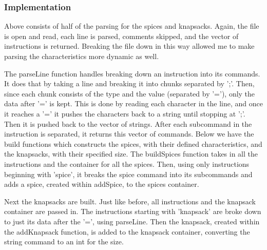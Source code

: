 \documentclass[12pt, letterpaper]{article}
\begin{document}
\subsubsection{Implementation}
\begin{center}
   
\end{center}
Above consists of half of the parsing for the spices and knapsacks.
Again, the file is open and read, each line is parsed, comments skipped, and the vector of instructions is returned.
Breaking the file down in this way allowed me to make parsing the characteristics more dynamic as well.
\begin{center}
   
\end{center}
The parseLine function handles breaking down an instruction into its commands.
It does that by taking a line and breaking it into chunks separated by ';'.
Then, since each chunk consists of the type and the value (separated by '='), only the data after '=' is kept.
This is done by reading each character in the line, and once it reaches a '=' it pushes the characters back to a string until stopping at ';'.
Then it is pushed back to the vector of strings.
After each subcommand in the instruction is separated, it returns this vector of commands.
\vspace*{5px}
\newline
Below we have the build functions which constructs the spices, with their defined characteristics, and the knapsacks, with their specified size.
The buildSpices function takes in all the instructions and the container for all the spices.
Then, using only instructions beginning with 'spice', it breaks the spice command into its subcommands and adds a spice, created within addSpice, to the spices container.
\begin{center}
   
\end{center}
Next the knapsacks are built.
Just like before, all instructions and the knapsack container are passed in.
The instructions starting with 'knapsack' are broke down to just its data after the '=', using parseLine.
Then the knapsack, created within the addKnapsack function, is added to the knapsack container, converting the string command to an int for the size.
\begin{center}
   
\end{center}
\end{document}
